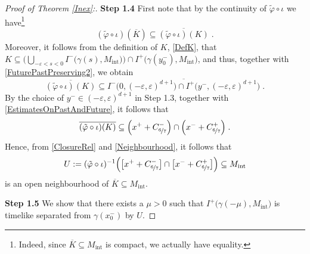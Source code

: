 \documentclass[reqno]{article}
\newcommand{\ed}{(-\varepsilon, \varepsilon)^{d+1}}
\newcommand{\Mint}{M_{\mathrm{int}}}
\begin{document}
\begin{proof}[Proof of Theorem \ref{Inex}:]
\textbf{Step 1.4} First note that by the continuity of $\tilde{\varphi} \circ \iota$ we have\footnote{Indeed, since $\overline{K} \subseteq \Mint$ is compact, we actually have equality.}
\begin{equation}
\label{ClosureRel}
(\tilde{\varphi}\circ \iota)(\overline{K})  \subseteq \overline{(\tilde{\varphi} \circ \iota)(K)} \;.
\end{equation}
Moreover, it follows from the definition of $K$, \eqref{DefK}, that $K \subseteq \Big(\bigcup_{-\varepsilon < s < 0} I^-\big(\gamma(s), \Mint \big)\Big) \cap I^+\big( \gamma(y^-_0), \Mint\big)$, and thus, together with \eqref{FuturePastPreserving2}, we obtain
\begin{equation*}
\overline{(\tilde{\varphi} \circ \iota)(K)}  \subseteq \overline{I^-\big(0, \ed\big) \cap I^+\big(y^-, \ed\big)} \;.
\end{equation*}
By the choice of $y^- \in \ed$ in Step 1.3, together with \eqref{EstimatesOnPastAndFuture}, it follows that
\begin{equation}
\label{Neighbourhood}
\overline{(\tilde{\varphi} \circ \iota)(K)}  \subseteq  \Big(x^+ + C^-_{\nicefrac{6}{7}}\Big) \cap \Big(x^- + C^+_{\nicefrac{6}{7}}\Big)\;.
\end{equation}
Hence, from \eqref{ClosureRel} and \eqref{Neighbourhood}, it follows that 
\begin{equation*}
U:= (\tilde{\varphi} \circ \iota)^{-1}\Big(\big[x^+ + C^-_{\nicefrac{6}{7}}\big] \cap \big[x^- + C^+_{\nicefrac{6}{7}}\big]\Big) \subseteq \Mint
\end{equation*}
is an open neighbourhood of $\overline{K} \subseteq \Mint$.
\vspace*{2mm}

\textbf{Step 1.5} We show that there exists a $\mu >0$ such that $I^+\big(\gamma(-\mu), \Mint\big)$ is timelike separated from $\gamma(x^-_0)$ by $U$.
\vspace*{2mm}


\end{proof}
\end{document}
